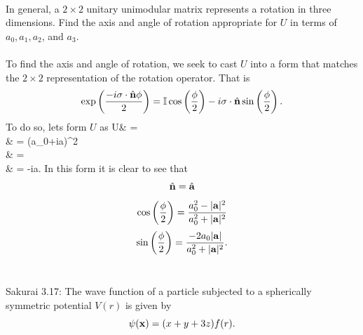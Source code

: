 \documentclass[11pt,letterpaper]{article}
\begin{document}
		\\
		\item
		In general, a $2\times 2$ unitary unimodular matrix represents a rotation in three dimensions. Find the axis and angle of
		rotation appropriate for $U$ in terms of $a_0,a_1,a_2$, and $a_3$. 
		\\
		\\
		To find the axis and angle of rotation, we seek to cast $U$ into a form that matches the $2\times 2$ representation 
		of the rotation operator. That is
		\[
			\exp\left(\frac{-i\mathbf{\sigma}\cdot\hat{\mathbf{n}}\phi}{2}\right) = \mathbb I\cos\left(\frac{\phi}{2}\right)-i\mathbf{\sigma}\cdot\hat{\mathbf{n}}\sin\left(\frac{\phi}{2}\right).
		\]
		To do so, lets form $U$ as
		\ba
			U& = \\
			& = (a_0+i\sigma\cdot\vect a)^2\\
			& = \\
			& = -i\sigma\cdot\vecth a.
		\ea
		In this form it is clear to see that
		\[
			 \hat{\mathbf{n}} = \hat{\mathbf{a}}
		\]
		\[
			\cos\left(\frac{\phi}{2}\right) = \frac{a_0^2-|\mathbf{a}|^2}{a_0^2+|\mathbf{a}|^2}
		\]
		\[
			\sin\left(\frac{\phi}{2}\right) = \frac{-2a_0|\mathbf{a}|}{a_0^2+|\mathbf{a}|^2}.
		\]
		\\	
		\eenum
		
		
	\item 
	Sakurai 3.17: The wave function of a particle subjected to a spherically symmetric potential $V(r)$ is given by
	\[
		\psi(\mathbf{x}) = (x+y+3z)f(r).
	\]
	
\end{document}
